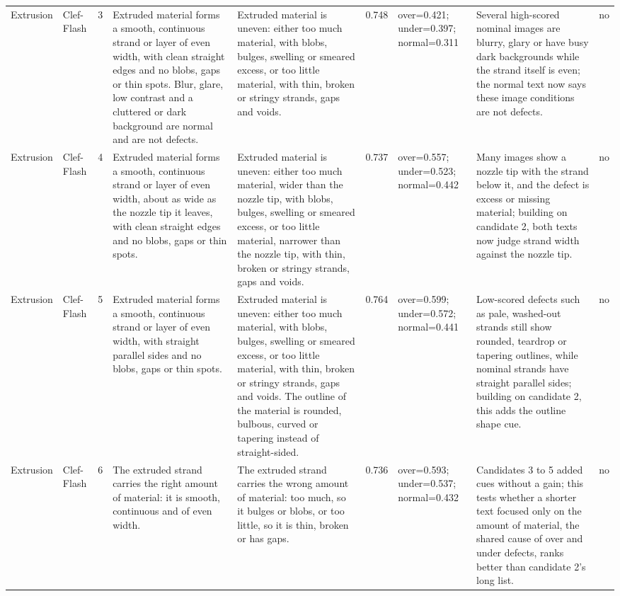\begin{table}
\begin{tabular}[t]{llrllrlll}
Extrusion & Clef-Flash & 3 & Extruded material forms a smooth, continuous strand or layer of even width, with clean straight edges and no blobs, gaps or thin spots. Blur, glare, low contrast and a cluttered or dark background are normal and are not defects. & Extruded material is uneven: either too much material, with blobs, bulges, swelling or smeared excess, or too little material, with thin, broken or stringy strands, gaps and voids. & 0.748 & over=0.421; under=0.397; normal=0.311 & Several high-scored nominal images are blurry, glary or have busy dark backgrounds while the strand itself is even; the normal text now says these image conditions are not defects. & no\\
Extrusion & Clef-Flash & 4 & Extruded material forms a smooth, continuous strand or layer of even width, about as wide as the nozzle tip it leaves, with clean straight edges and no blobs, gaps or thin spots. & Extruded material is uneven: either too much material, wider than the nozzle tip, with blobs, bulges, swelling or smeared excess, or too little material, narrower than the nozzle tip, with thin, broken or stringy strands, gaps and voids. & 0.737 & over=0.557; under=0.523; normal=0.442 & Many images show a nozzle tip with the strand below it, and the defect is excess or missing material; building on candidate 2, both texts now judge strand width against the nozzle tip. & no\\
\addlinespace
Extrusion & Clef-Flash & 5 & Extruded material forms a smooth, continuous strand or layer of even width, with straight parallel sides and no blobs, gaps or thin spots. & Extruded material is uneven: either too much material, with blobs, bulges, swelling or smeared excess, or too little material, with thin, broken or stringy strands, gaps and voids. The outline of the material is rounded, bulbous, curved or tapering instead of straight-sided. & 0.764 & over=0.599; under=0.572; normal=0.441 & Low-scored defects such as pale, washed-out strands still show rounded, teardrop or tapering outlines, while nominal strands have straight parallel sides; building on candidate 2, this adds the outline shape cue. & no\\
Extrusion & Clef-Flash & 6 & The extruded strand carries the right amount of material: it is smooth, continuous and of even width. & The extruded strand carries the wrong amount of material: too much, so it bulges or blobs, or too little, so it is thin, broken or has gaps. & 0.736 & over=0.593; under=0.537; normal=0.432 & Candidates 3 to 5 added cues without a gain; this tests whether a shorter text focused only on the amount of material, the shared cause of over and under defects, ranks better than candidate 2's long list. & no\\

\end{tabular}
\end{table}

